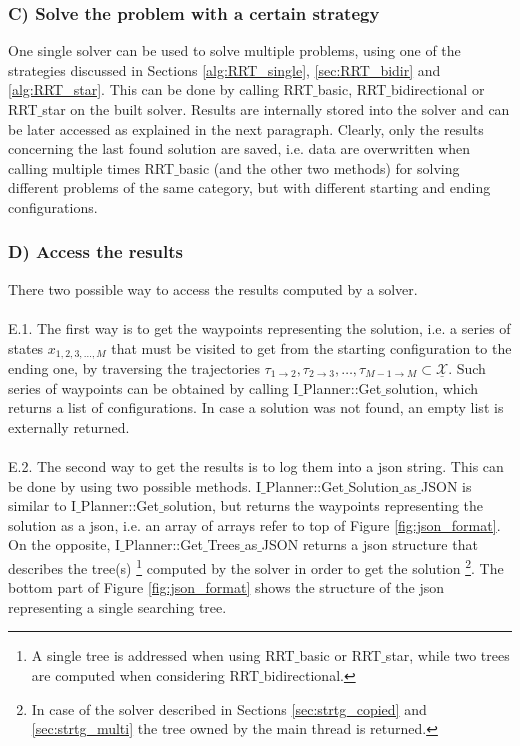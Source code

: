 \subsubsection{C) Solve the problem with a certain strategy}

One single solver can be used to solve multiple problems, using one of the strategies discussed in Sections \ref{alg:RRT_single}, \ref{sec:RRT_bidir} and \ref{alg:RRT_star}. This can be done by calling RRT$\_$basic, RRT$\_$bidirectional or RRT$\_$star on the built solver.
Results are internally stored into the solver and can be later accessed as explained in the next paragraph. Clearly, only the results concerning the last found solution are saved, i.e. data are overwritten when calling multiple times RRT$\_$basic (and the other two methods) for solving different problems of the same category, but with different starting and ending configurations.

\subsubsection{D) Access the results}

There two possible way  to access the results computed by a solver.
\\
\\
E.1. The first way is to get the waypoints representing the solution, i.e. a series of states $x_{1,2,3,\hdots,M}$ that must be visited to get from the starting configuration to the ending one, by traversing the trajectories $\tau_{1 \rightarrow 2 } , \tau_{2 \rightarrow 3}, \hdots ,\tau_{M-1 \rightarrow M} \subset \underline{\mathcal{X}}$. Such series of waypoints can be obtained by calling I$\_$Planner::Get$\_$solution, which returns a list of configurations. In case a solution was not found, an empty list is externally returned.
\\
\\
E.2. The second way to get the results is to log them into a json string. This can be done by using two possible methods.
I$\_$Planner::Get$\_$Solution$\_$as$\_$JSON is similar to I$\_$Planner::Get$\_$solution, but returns the waypoints representing the solution as a json, i.e. an array of arrays refer to top of Figure \ref{fig:json_format}. On the opposite, I$\_$Planner::Get$\_$Trees$\_$as$\_$JSON returns a json structure that describes the tree(s) \footnote{A single tree is addressed when using RRT$\_$basic or RRT$\_$star, while two trees are computed when considering RRT$\_$bidirectional.} computed by the solver in order to get the solution \footnote{In case of the solver described in Sections \ref{sec:strtg_copied} and \ref{sec:strtg_multi} the tree owned by the main thread is returned. }. The bottom part of Figure \ref{fig:json_format} shows the structure of the json representing a single searching tree.

